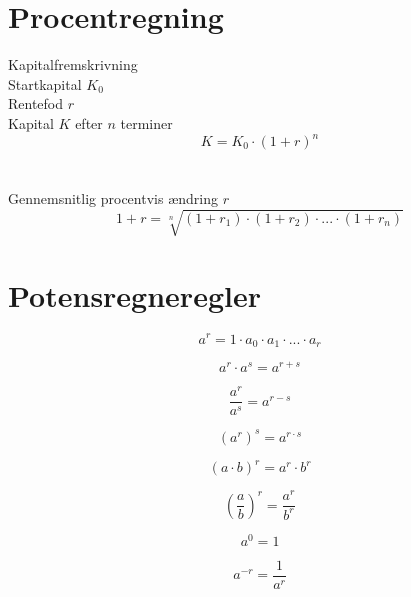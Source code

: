 \documentclass[11pt,a5paper,fleqn,leqno]{book}
\begin{document}
\section{Procentregning}

Kapitalfremskrivning \\
Startkapital $K_0$ \\
Rentefod $r$ \\
Kapital $K$ efter $n$ terminer
\begin{equation}
K = K_{0} \cdot \left(1+r\right)^{n}
\end{equation}
\\
\\
Gennemsnitlig procentvis ændring $r$
\begin{equation}
1+r = \sqrt[n]{\left(1+r_{1}\right) \cdot \left(1+r_{2}\right) \cdot ... \cdot \left(1+r_{n}\right)}
\end{equation} 

\newpage

\section{Potensregneregler}

\begin{equation}
a^r = 1 \cdot a_0 \cdot a_1 \cdot ... \cdot a_r
\end{equation}

\begin{equation}
a^r \cdot a^s = a^{r+s}
\end{equation}

\begin{equation}
\dfrac{a^r}{a^s} = a^{r-s}
\end{equation}

\begin{equation}
\left(a^r\right)^s = a^{r \cdot s}
\end{equation}

\begin{equation}
\left(a \cdot b\right)^{r} = a^{r} \cdot b^{r}
\end{equation}

\begin{equation}
\left(\dfrac{a}{b}\right)^{r} = \dfrac{a^{r}}{b^{r}}
\end{equation}

\begin{equation}
a^{0} = 1
\end{equation}

\begin{equation}
a^{-r} = \dfrac{1}{a^{r}}
\end{equation}
\end{document}
